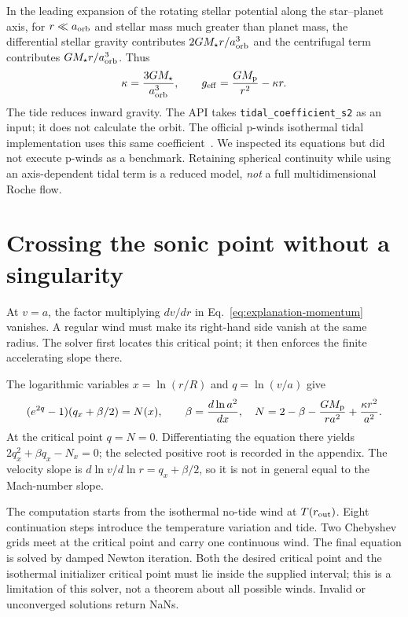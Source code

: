 \documentclass[10pt,a4paper]{article}
\begin{document}
In the leading expansion of the rotating stellar potential along the
star--planet axis, for $r\ll a_{\rm orb}$ and stellar mass much greater than planet
mass, the differential stellar gravity contributes $2GM_\star r/a_{\rm orb}^3$
and the centrifugal term contributes $GM_\star r/a_{\rm orb}^3$. Thus
\begin{equation}
 \kappa=\frac{3GM_\star}{a_{\rm orb}^3},\qquad
 g_{\rm eff}=\frac{GM_{\rm p}}{r^2}-\kappa r .
\end{equation}
The tide reduces inward gravity. The API takes \texttt{tidal\_coefficient\_s2}
as an input; it does not calculate the orbit. The official p-winds isothermal
tidal implementation uses this same coefficient~\cite{pwinds}. We inspected
its equations but did not execute p-winds as a benchmark. Retaining spherical
continuity while using an axis-dependent tidal term is a reduced model,
\emph{not} a full multidimensional Roche flow.

\section{Crossing the sonic point without a singularity}
At $v=a$, the factor multiplying $dv/dr$ in
Eq.~\eqref{eq:explanation-momentum} vanishes. A regular wind must make its
right-hand side vanish at the same radius. The solver first locates this
critical point; it then enforces the finite accelerating slope there.

The logarithmic variables $x=\ln(r/R)$ and $q=\ln(v/a)$ give
\begin{equation}
 (e^{2q}-1)(q_x+\beta/2)=N(x),\qquad
 \beta=\frac{d\ln a^2}{dx},\quad
 N=2-\beta-\frac{GM_{\rm p}}{ra^2}+\frac{\kappa r^2}{a^2}.
\end{equation}
At the critical point $q=N=0$. Differentiating the equation there yields
$2q_x^2+\beta q_x-N_x=0$; the selected positive root is recorded in the
appendix. The velocity slope is $d\ln v/d\ln r=q_x+\beta/2$, so it is not in
general equal to the Mach-number slope.

The computation starts from the isothermal no-tide wind at $T(r_{\rm out})$.
Eight continuation steps introduce the temperature variation and tide. Two
Chebyshev grids meet at the critical point and carry one continuous wind.
The final equation is solved by damped Newton iteration. Both the desired
critical point and the isothermal initializer critical point must lie inside
the supplied interval; this is a limitation of this solver, not a theorem
about all possible winds. Invalid or unconverged solutions return NaNs.
\end{document}
